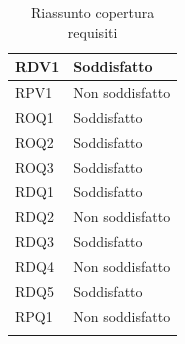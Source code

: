 \begin{longtable}{| p{2.5cm} | p{3cm} |}
	RDV1 & Soddisfatto \\ \hline
	\rowcolor{LightGray}
	RPV1 & Non soddisfatto \\ \hline
	ROQ1 & Soddisfatto \\ \hline
	\rowcolor{LightGray}
	ROQ2 & Soddisfatto \\ \hline
	ROQ3 & Soddisfatto \\ \hline
	\rowcolor{LightGray}
	RDQ1 & Soddisfatto \\ \hline
	RDQ2 & Non soddisfatto \\ \hline
	\rowcolor{LightGray}
	RDQ3 & Soddisfatto \\ \hline
	RDQ4 & Non soddisfatto \\ \hline
	\rowcolor{LightGray}
	RDQ5 & Soddisfatto \\ \hline
	RPQ1 & Non soddisfatto \\ \hline
	\caption{Riassunto copertura requisiti}
\end{longtable}


	

